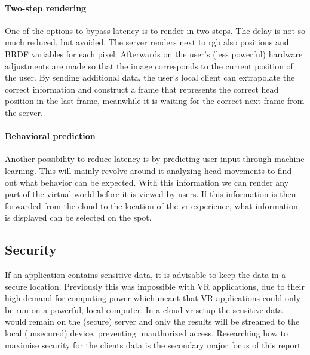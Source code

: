 \paragraph{Two-step rendering}
One of the options to bypass latency is to render in two steps.
The delay is not so much reduced, but avoided. The server renders next to
\acrshort{rgb} also positions and BRDF variables for each pixel. Afterwards on the
user's (less powerful) hardware adjustments are made so that the image corresponds to the current position of the user.
By sending additional data, the user's local client can extrapolate the correct information and construct a frame that represents the correct head position in the last frame, meanwhile it is waiting for the  correct next frame from the server.
\paragraph{Behavioral prediction}
Another possibility to reduce latency is by predicting
user input through machine learning. This will mainly revolve around it
analyzing head movements to find out what behavior can be expected. With
this information we can render any part of the virtual world before it
is viewed by users. If this information is then forwarded from the
cloud to the location of the \acrshort{vr} experience, what information is displayed can be selected on the spot.

\subsection{Security}
If an application contains sensitive data, it is advisable to keep the data in a secure location. Previously this was impossible with VR applications, due to their high demand for computing power which meant that VR applications could only be run on a powerful, local computer. In a cloud \acrshort{vr} setup the sensitive data would remain on the (secure) server and only the results will be streamed to the local (unsecured) device, preventing unauthorized access. Researching how to maximise security for the clients data is the secondary major focus of this report.